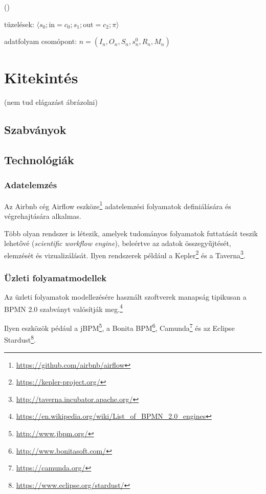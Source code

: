  


 ()

\newcommand{\prioritas}{\pi}
\newcommand{\tuple}[1]{\langle #1 \rangle}

tüzelések: $\tuple{s_0; \mathrm{in} = c_0; s_1; \mathrm{out} = c_2; \prioritas}$

adatfolyam csomópont: $n = (I_n, O_n, S_n, s_n^0, R_n, M_n)$

\section{Kitekintés\kieg}


 (nem tud elágazást ábrázolni)

\subsection{Szabványok}


\subsection{Technológiák}

\subsubsection{Adatelemzés}

Az Airbnb cég Airflow eszköze\footnote{\url{https://github.com/airbnb/airflow}} adatelemzési folyamatok definiálására és végrehajtására alkalmas.

Több olyan rendszer is létezik, amelyek tudományos folyamatok futtatását teszik lehetővé (\emph{scientific workflow engine}), beleértve az adatok összegyűjtését, elemzését és vizualizálását. Ilyen rendszerek például a
Kepler\footnote{\url{https://kepler-project.org/}} és a Taverna\footnote{\url{http://taverna.incubator.apache.org/}}.

\subsubsection{Üzleti folyamatmodellek}

Az üzleti folyamatok modellezésére használt szoftverek manapság tipikusan a BPMN 2.0 szabványt valósítják meg.\footnote{\url{https://en.wikipedia.org/wiki/List_of_BPMN_2.0_engines}}

Ilyen eszközök pédául a jBPM\footnote{\url{http://www.jbpm.org/}}, a Bonita BPM\footnote{\url{http://www.bonitasoft.com/}}, Camunda\footnote{\url{https://camunda.org/}} és az Eclipse Stardust\footnote{\url{https://www.eclipse.org/stardust/}}.
